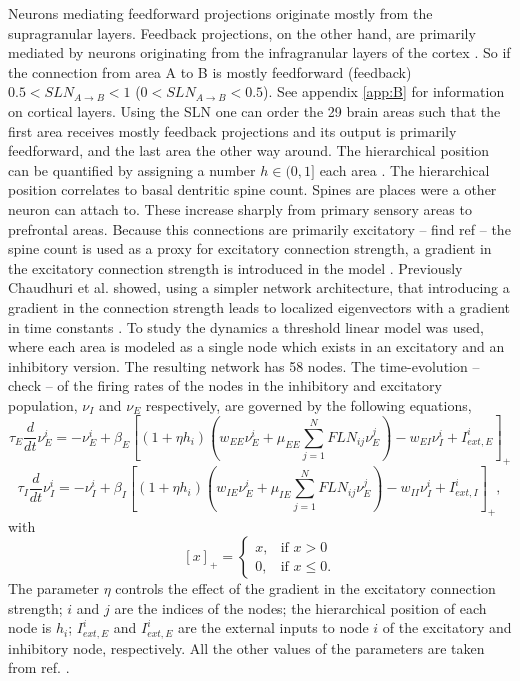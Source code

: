 Neurons mediating feedforward projections originate mostly from the supragranular layers.
Feedback projections, on the other hand, are primarily mediated by neurons originating from the infragranular layers of the cortex \cite{felleman1991distributed}. So if the connection from area A to B is mostly feedforward (feedback) $0.5 < SLN_{A\rightarrow B} < 1$ ($0 < SLN_{A\rightarrow B} <0.5$).
See appendix \ref{app:B} for information on cortical layers.
Using the SLN one can order the 29 brain areas such that the first area receives mostly feedback projections and its output is primarily feedforward, and the last area the other way around.
The hierarchical position can be quantified by assigning a number $h\in (0,1]$ each area \cite{chaudhuri2015large-scale, markov2014anatomy}.
The hierarchical position correlates to basal dentritic spine count. Spines are places were a other neuron can attach to. These  increase sharply from primary sensory areas to prefrontal areas.
Because this connections are primarily excitatory -- find ref -- the spine count is used as a proxy for excitatory connection strength, a gradient in the excitatory connection strength is introduced in the model \cite{elston2000pyramidal,elston2011pyramidal}.
Previously Chaudhuri et al. showed, using a simpler network architecture, that introducing a gradient in the connection strength leads to localized eigenvectors with a gradient in time constants \cite{chaudhuri2014diversity}.
To study the dynamics a threshold linear model was used, where each area is modeled as a single node which exists in an excitatory and an inhibitory version.
The resulting  network has 58 nodes. 
The time-evolution -- check -- of the firing rates of the nodes in the inhibitory and excitatory population, $\nu_I$ and $\nu_E$ respectively, are governed by the following equations,
\begin{equation}
\label{eq:wang_exc}
\tau_E \frac{d}{dt} \nu_E^i = - \nu_E^i + \beta_E \left[ \left( 1+\eta h_i \right) \left( w_{EE} \nu_E^i + \mu_{EE} \sum_{j=1}^N FLN_{ij} \nu_E^j \right) - w_{EI} \nu_I^i+ I_{ext,E}^i \right]_+
\end{equation}
\begin{equation}
\label{eq:wang_inh}
\tau_I \frac{d}{dt} \nu_I^i = - \nu_I^i + \beta_I \left[ \left( 1+\eta h_i \right) \left( w_{IE} \nu_E^i + \mu_{IE} \sum_{j=1}^N FLN_{ij} \nu_E^j \right) - w_{II} \nu_I^i+ I_{ext,I}^i \right]_+,
\end{equation}
with
\begin{equation*}
\left[x \right]_+ = \begin{cases}
	x, & \text{if } x>0\\
	0, & \text{if } x\leq0.
	\end{cases}
\end{equation*}
The parameter $\eta$ controls the effect of the gradient in the excitatory connection strength; $i$ and $j$ are the indices of the nodes; the hierarchical position of each node is $h_i$; $I_{ext,E}^i$ and $I_{ext,E}^i$ are the external inputs to node $i$ of the excitatory and inhibitory node, respectively.
All the other values of the parameters are taken from ref. \cite{binzegger2009topology}.

